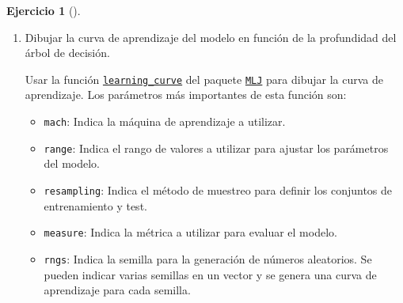 \documentclass[
  a4paper,
]{scrreport}
\providecommand{\tightlist}{%
  \setlength{\itemsep}{0pt}\setlength{\parskip}{0pt}}\usepackage{longtable,booktabs,array}
\theoremstyle{definition}
\newtheorem{exercise}{Ejercicio}[chapter]
\theoremstyle{remark}
\begin{document}
\begin{exercise}[]
\begin{enumerate}
\begin{tcolorbox}
\begin{verbatim}
DecisionTreeClassifier(
  max_depth = 5, 
  min_samples_leaf = 1, 
  min_samples_split = 2, 
  min_purity_increase = 0.0, 
  n_subfeatures = 0, 
  post_prune = false, 
  merge_purity_threshold = 1.0, 
  display_depth = 5, 
  feature_importance = :impurity, 
  rng = TaskLocalRNG())
\end{verbatim}

  \end{tcolorbox}
\item
  Dibujar la curva de aprendizaje del modelo en función de la
  profundidad del árbol de decisión.

  \begin{tcolorbox}[enhanced jigsaw, left=2mm, colback=white, coltitle=black, opacitybacktitle=0.6, titlerule=0mm, breakable, bottomrule=.15mm, toptitle=1mm, bottomtitle=1mm, colbacktitle=quarto-callout-note-color!10!white, opacityback=0, rightrule=.15mm, title=\textcolor{quarto-callout-note-color}{\faInfo}\hspace{0.5em}{Ayuda}, colframe=quarto-callout-note-color-frame, arc=.35mm, leftrule=.75mm, toprule=.15mm]

  Usar la función
  \href{https://juliaai.github.io/MLJ.jl/stable/learning_curves/\#MLJBase.learning_curve}{\texttt{learning\_curve}}
  del paquete \href{https://juliaai.github.io/MLJ.jl/}{\texttt{MLJ}}
  para dibujar la curva de aprendizaje. Los parámetros más importantes
  de esta función son:

  \begin{itemize}
  \tightlist
  \item
    \texttt{mach}: Indica la máquina de aprendizaje a utilizar.
  \item
    \texttt{range}: Indica el rango de valores a utilizar para ajustar
    los parámetros del modelo.
  \item
    \texttt{resampling}: Indica el método de muestreo para definir los
    conjuntos de entrenamiento y test.
  \item
    \texttt{measure}: Indica la métrica a utilizar para evaluar el
    modelo.
  \item
    \texttt{rngs}: Indica la semilla para la generación de números
    aleatorios. Se pueden indicar varias semillas en un vector y se
    genera una curva de aprendizaje para cada semilla.
  \end{itemize}

  \end{tcolorbox}


\end{enumerate}
\end{exercise}
\end{document}
